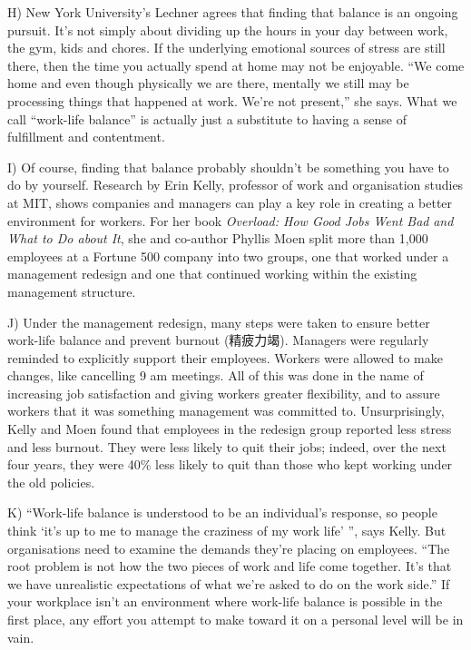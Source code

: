 \documentclass[UTF8,11pt]{ctexart}
\begin{document}
H) New York University’s Lechner agrees that finding that balance is an ongoing pursuit. It’s not simply about dividing up the hours in your day between work, the gym, kids and chores. If the underlying emotional sources of stress are still there, then the time you actually spend at home may not be enjoyable. “We come home and even though physically we are there, mentally we still may be processing things that happened at work. We’re not present,” she says. What we call “work-life balance” is actually just a substitute to having a sense of fulfillment and contentment.


I) Of course, finding that balance probably shouldn’t be something you have to do by yourself. Research by Erin Kelly, professor of work and organisation studies at MIT, shows companies and managers can play a key role in creating a better environment for workers. For her book \textit{Overload: How Good Jobs Went Bad} \textit{and What to Do about It}, she and co-author Phyllis Moen split more than 1,000 employees at a Fortune 500 company into two groups, one that worked under a management redesign and one that continued working within the existing management structure.


J) Under the management redesign, many steps were taken to ensure better work-life balance and prevent burnout (精疲力竭). Managers were regularly reminded to explicitly support their employees. Workers were allowed to make changes, like cancelling 9 am meetings. All of this was done in the name of increasing job satisfaction and giving workers greater flexibility, and to assure workers that it was something management was committed to. Unsurprisingly, Kelly and Moen found that employees in the redesign group reported less stress and less burnout. They were less likely to quit their jobs; indeed, over the next four years, they were 40\% less likely to quit than those who kept working under the old policies.


K) “Work-life balance is understood to be an individual’s response, so people think ‘it’s up to me to manage the craziness of my work life’ ”, says Kelly. But organisations need to examine the demands they’re placing on employees. “The root problem is not how the two pieces of work and life come together. It’s that we have unrealistic expectations of what we’re asked to do on the work side.” If your workplace isn’t an environment where work-life balance is possible in the first place, any effort you attempt to make toward it on a personal level will be in vain.
\end{document}
